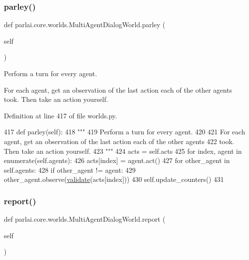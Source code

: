 \subsubsection{\texorpdfstring{parley()}{parley()}}
{\footnotesize\ttfamily def parlai.\+core.\+worlds.\+Multi\+Agent\+Dialog\+World.\+parley (\begin{DoxyParamCaption}\item[{}]{self }\end{DoxyParamCaption})}

\begin{DoxyVerb}Perform a turn for every agent.

For each agent, get an observation of the last action each of the other agents
took. Then take an action yourself.
\end{DoxyVerb}
 

Definition at line 417 of file worlds.\+py.


\begin{DoxyCode}
417     \textcolor{keyword}{def }parley(self):
418         \textcolor{stringliteral}{"""}
419 \textcolor{stringliteral}{        Perform a turn for every agent.}
420 \textcolor{stringliteral}{}
421 \textcolor{stringliteral}{        For each agent, get an observation of the last action each of the other agents}
422 \textcolor{stringliteral}{        took. Then take an action yourself.}
423 \textcolor{stringliteral}{        """}
424         acts = self.acts
425         \textcolor{keywordflow}{for} index, agent \textcolor{keywordflow}{in} enumerate(self.agents):
426             acts[index] = agent.act()
427             \textcolor{keywordflow}{for} other\_agent \textcolor{keywordflow}{in} self.agents:
428                 \textcolor{keywordflow}{if} other\_agent != agent:
429                     other\_agent.observe(\hyperlink{namespaceparlai_1_1core_1_1worlds_afc3fad603b7bce41dbdc9cdc04a9c794}{validate}(acts[index]))
430         self.update\_counters()
431 
\end{DoxyCode}
\mbox{\label{classparlai_1_1core_1_1worlds_1_1MultiAgentDialogWorld_a686b237998ede0e9431dd58bca2b34c1}} 
\subsubsection{\texorpdfstring{report()}{report()}}
{\footnotesize\ttfamily def parlai.\+core.\+worlds.\+Multi\+Agent\+Dialog\+World.\+report (\begin{DoxyParamCaption}\item[{}]{self }\end{DoxyParamCaption})}

